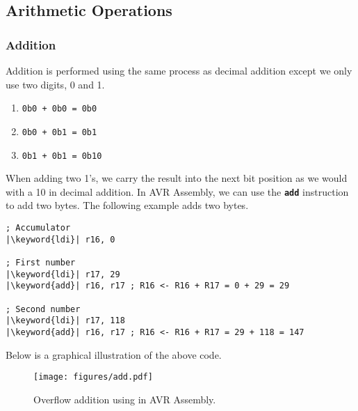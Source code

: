 \documentclass{article}
\newcommand{\keyword}[1]{\textcolor[rgb]{0.00,0.50,0.00}{\textbf{#1}}}
\newcommand{\keywordinline}[1]{\textcolor[rgb]{0.00,0.50,0.00}{\textbf{\texttt{#1}}}}
\begin{document}
\subsection{Arithmetic Operations}
\subsubsection{Addition}
Addition is performed using the same process as decimal addition except
we only use two digits, 0 and 1.
\begin{enumerate}
    \item \texttt{0b0 + 0b0 = 0b0}
    \item \texttt{0b0 + 0b1 = 0b1}
    \item \texttt{0b1 + 0b1 = 0b10}
\end{enumerate}
When adding two 1's, we carry the result into the next bit position as we would with a 10 in decimal addition.
In AVR Assembly, we can use the \keywordinline{add} instruction to add two bytes. The following
example adds two bytes.
\begin{verbatim}
; Accumulator
|\keyword{ldi}| r16, 0

; First number
|\keyword{ldi}| r17, 29
|\keyword{add}| r16, r17 ; R16 <- R16 + R17 = 0 + 29 = 29

; Second number
|\keyword{ldi}| r17, 118
|\keyword{add}| r16, r17 ; R16 <- R16 + R17 = 29 + 118 = 147
\end{verbatim}
Below is a graphical illustration of the above code.
\begin{figure}[H]
    \centering
    \texttt{[image: figures/add.pdf]}
    \caption{Overflow addition using \keyword{} in AVR Assembly.} %
\end{figure}
\end{document}
